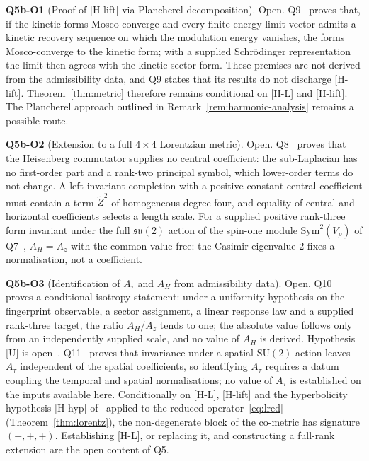 \documentclass[11pt,a4paper]{article}
\theoremstyle{definition}
\theoremstyle{remark}
\begin{document}
    \textbf{Q5b-O1} (Proof of [H-lift] via Plancherel decomposition).
    Open.
    Q9~\cite{Beau2026q9} proves that, if the kinetic forms Mosco-converge and every finite-energy limit vector admits a
    kinetic recovery sequence on which the modulation energy vanishes, the forms Mosco-converge to the kinetic form;
    with a supplied Schr\"odinger representation the limit then agrees with the kinetic-sector form.
    These premises are not derived from the admissibility data, and Q9 states that its results do not discharge
    [H-lift].
    Theorem~\ref{thm:metric} therefore remains conditional on [H-L] and [H-lift].
    The Plancherel approach outlined in Remark~\ref{rem:harmonic-analysis} remains a possible route.

    \textbf{Q5b-O2} (Extension to a full $4 \times 4$ Lorentzian metric).
    Open.
    Q8~\cite{BeauQ8} proves that the Heisenberg commutator supplies no central coefficient: the sub-Laplacian has no
    first-order part and a rank-two principal symbol, which lower-order terms do not change.
    A left-invariant completion with a positive constant central coefficient must contain a term $\tilde Z^2$ of
    homogeneous degree four, and equality of central and horizontal coefficients selects a length scale.
    For a supplied positive rank-three form invariant under the full $\mathfrak{su}(2)$ action of the spin-one
    module $\mathrm{Sym}^2(V_\rho)$ of Q7~\cite{Beau2026q7}, $A_H = A_z$ with the common value free: the Casimir
    eigenvalue $2$ fixes a normalisation, not a coefficient.

    \textbf{Q5b-O3} (Identification of $A_\tau$ and $A_H$ from admissibility data).
    \label{ssec:resolved-o3}
    Open.
    Q10~\cite{Beau2026q10} proves a conditional isotropy statement: under a uniformity hypothesis on the fingerprint
    observable, a sector assignment, a linear response law and a supplied rank-three target, the ratio $A_H/A_z$
    tends to one; the absolute value follows only from an independently supplied scale, and no value of $A_H$ is
    derived.
    Hypothesis [U] is open~\cite{Beau2026u1}.
    Q11~\cite{Beau2026q11} proves that invariance under a spatial $\mathrm{SU}(2)$ action leaves $A_\tau$ independent
    of the spatial coefficients, so identifying $A_\tau$ requires a datum coupling the temporal and spatial
    normalisations; no value of $A_\tau$ is established on the inputs available here.
    Conditionally on [H-L], [H-lift] and the hyperbolicity hypothesis [H-hyp] of~\cite{Beau2026c} applied to the
    reduced operator~\eqref{eq:lred} (Theorem~\ref{thm:lorentz}), the non-degenerate block of the co-metric has
    signature $(-,+,+)$.
    Establishing [H-L], or replacing it, and constructing a full-rank extension are the open content of Q5.
\end{document}
